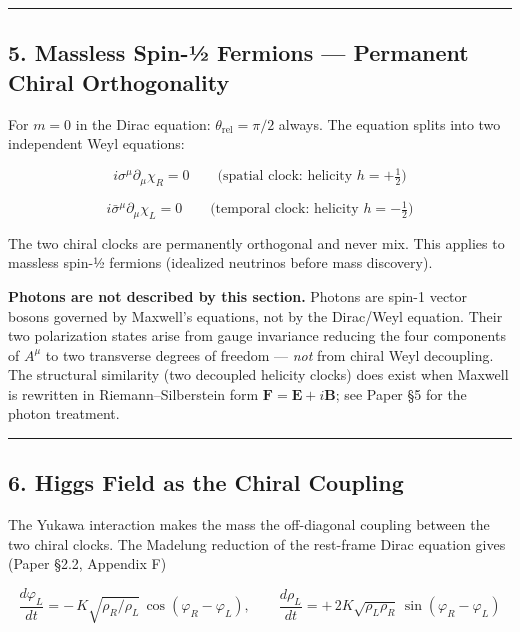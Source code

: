 \documentclass[
]{article}
\begin{document}
\begin{center}\rule{0.5\linewidth}{0.5pt}\end{center}

\subsection{5. Massless Spin-½ Fermions --- Permanent Chiral
Orthogonality}\label{massless-spin-uxbd-fermions-permanent-chiral-orthogonality}

For \(m = 0\) in the Dirac equation: \(\theta_{\text{rel}} = \pi/2\)
always. The equation splits into two independent Weyl equations:

\[i\sigma^\mu \partial_\mu \chi_R = 0 \qquad \text{(spatial clock: helicity } h = +\tfrac{1}{2}\text{)}\]

\[i\bar{\sigma}^\mu \partial_\mu \chi_L = 0 \qquad \text{(temporal clock: helicity } h = -\tfrac{1}{2}\text{)}\]

The two chiral clocks are permanently orthogonal and never mix. This
applies to massless spin-½ fermions (idealized neutrinos before mass
discovery).

\textbf{Photons are not described by this section.} Photons are spin-1
vector bosons governed by Maxwell's equations, not by the Dirac/Weyl
equation. Their two polarization states arise from gauge invariance
reducing the four components of \(A^\mu\) to two transverse degrees of
freedom --- \emph{not} from chiral Weyl decoupling. The structural
similarity (two decoupled helicity clocks) does exist when Maxwell is
rewritten in Riemann--Silberstein form
\(\mathbf{F} = \mathbf{E} + i\mathbf{B}\); see Paper §5 for the photon
treatment.

\begin{center}\rule{0.5\linewidth}{0.5pt}\end{center}

\subsection{6. Higgs Field as the Chiral
Coupling}\label{higgs-field-as-the-chiral-coupling}

The Yukawa interaction makes the mass the off-diagonal coupling between
the two chiral clocks. The Madelung reduction of the rest-frame Dirac
equation gives (Paper §2.2, Appendix F)

\[\frac{d\varphi_L}{dt} = -\,K\sqrt{\rho_R/\rho_L}\,\cos(\varphi_R - \varphi_L), \qquad \frac{d\rho_L}{dt} = +\,2K\sqrt{\rho_L\rho_R}\,\sin(\varphi_R - \varphi_L)\]
\end{document}
